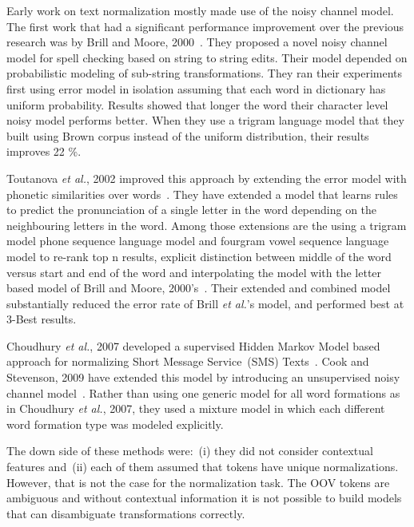\documentclass[a4paper,onesided,12pt]{report}
\begin{document}
Early work on text normalization mostly made use of the noisy channel model. The first work that had a significant performance improvement over the previous research was by Brill and Moore, 2000~\cite{Brill:2000:IEM:1075218.1075255}. They proposed a novel noisy channel model for spell checking based on string to string edits. Their model depended on probabilistic modeling of sub-string transformations. They ran their experiments first using error model in isolation assuming that each word in dictionary has uniform probability. Results showed that longer the word their character level noisy model performs better. When they use a trigram language model that they built using Brown corpus  instead of the uniform distribution, their results improves 22 \%.

Toutanova \textit{et al.}, 2002 improved this approach by extending the error model with phonetic similarities over words~\cite{Toutanova:2002:PMI:1073083.1073109}. They have extended a model that learns rules to predict the pronunciation of a single letter in the word depending on the neighbouring letters in the word. Among those extensions are the using a trigram model phone sequence language model and fourgram vowel sequence language model to re-rank top n results, explicit distinction between middle of the word versus start and end of the word and interpolating the model with the letter based model of Brill and Moore, 2000's~\cite{Brill:2000:IEM:1075218.1075255}. Their extended and combined model substantially reduced the error rate of Brill \textit{et al.}'s model, and performed best at 3-Best results.

Choudhury \textit{et al.}, 2007 developed a supervised Hidden Markov Model based approach for normalizing Short Message Service~(SMS) Texts~\cite{Choudhury:2007:IMS:1326044.1326048}. Cook and Stevenson, 2009 have extended this model by introducing an unsupervised noisy channel model~\cite{Cook:2009:UMT:1642011.1642021}. Rather than using one generic model for all word formations as in Choudhury \textit{et al.}, 2007, they used a mixture model in which each different word formation type was modeled explicitly.

The down side of these methods were:~(i) they did not consider contextual features and~(ii) each of them assumed that tokens have unique normalizations. However, that is not the case for the normalization task. The OOV tokens are ambiguous and without contextual information it is not possible to build models that can disambiguate transformations correctly.
\end{document}
